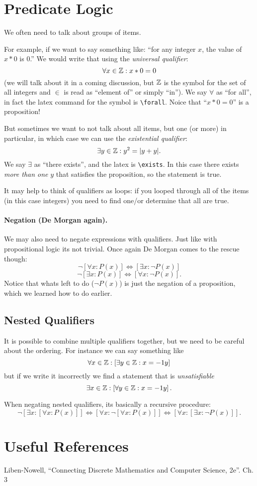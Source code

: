 \documentclass[11pt, oneside]{article}   	%
\begin{document}
\section{Predicate Logic}
We often need to talk about groups of items.

For example, if we want to say something like:
``for any integer $x$, the value of $x * 0$ is $0$.''
We would write that using the \emph{universal qualifier}:
\[\forall x\in\operatorname{\mathbb{Z}} : x*0 = 0\]
(we will talk about it in a coming discussion, but $\operatorname{\mathbb{Z}}$ is the symbol for the set of all integers and $\in$ is read as ``element of'' or simply ``in'').
We say $\forall$ as ``for all'', in fact the latex command for the symbol is \texttt{\textbackslash{}forall}.
Noice that ``$x*0 = 0$'' is a proposition!

But sometimes we want to not talk about all items, but one (or more) in particular, in which case we can use the \emph{existential qualifier}:
\[\exists y\in\operatorname{\mathbb{Z}}: y^2 = |y+y|.\]
We say $\exists$ as ``there exists'', and the latex is \texttt{\textbackslash{}exists}. 
In this case there exists \textit{more than one} $y$ that satisfies the proposition, so the statement is true.

It may help to think of qualifiers as loops: 
if you looped through all of the items (in this case integers) you need to find one/or determine that all are true. 

\paragraph{Negation (De Morgan again).}
 We may also need to negate expressions with qualifiers. 
 Just like with propositional logic its not trivial. 
 Once again De Morgan comes to the rescue though: 
 \[\neg \left[\forall x : P(x)\right] \iff \left[\exists x : \neg P(x)\right]\]
 \[\neg \left[\exists x : P(x)\right] \iff \left[\forall x : \neg P(x)\right].\]
 Notice that whats left to do ($\neg P(x)$) is just the negation of a proposition, which we learned how to do earlier. 

 \subsection{Nested Qualifiers}
 It is possible to combine multiple qualifiers together, but we need to be careful about the ordering. 
 For instance we can say something like 
 \[
 \forall x \in \operatorname{\mathbb{Z}} : \left[\exists y \in \operatorname{\mathbb{Z}} : x = -1 y\right]
 \]
 but if we write it incorrectly we find a statement that is \emph{unsatisfiable}
  \[
 \exists x \in \operatorname{\mathbb{Z}} : \left[\forall y \in \operatorname{\mathbb{Z}} : x = -1 y\right].
 \]
 
 When negating nested qualifiers, its basically a recursive procedure: 
  \[\neg \left[\exists x : \left[ \forall x: P(x)\right]\right] \iff \left[\forall x : \neg\left[ \forall x: P(x)\right]\right] \iff \left[\forall x : \left[ \exists x: \neg P(x)\right]\right].\]
  
\section*{Useful References}
Liben-Nowell, ``Connecting Discrete Mathematics and Computer Science, 2e''. Ch. 3 
\end{document}
